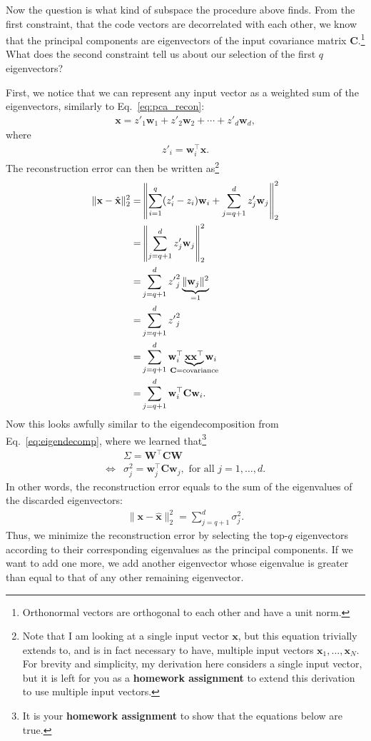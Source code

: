 \documentclass{report}
\newcommand{\vect}[1]{\mathbf{#1}}
\newcommand{\matr}[1]{\mathbf{#1}}
\newcommand{\vx}[0]{\vect{x}}
\newcommand{\vw}[0]{\vect{w}}
\newcommand{\mW}[0]{\matr{W}}
\newcommand{\mC}{\matr{C}}
\begin{document}
Now the question is what kind of subspace the procedure above finds. From the
first constraint, that the code vectors are decorrelated with each other, we
know that the principal components are eigenvectors of the input covariance
matrix $\mC$.\footnote{
    Orthonormal vectors are orthogonal to each other and have a unit norm.
} What does the second constraint tell us about our selection of the first $q$
eigenvectors?

First, we notice that we can represent any input vector as a weighted sum of the
eigenvectors, similarly to Eq.~\eqref{eq:pca_recon}:
\begin{align*}
    \vx = z'_1 \vw_1 + z'_2 \vw_2 + \cdots + z'_d \vw_d,
\end{align*}
where 
\begin{align*}
    z'_i = \vw_i^\top \vx.
\end{align*}
The reconstruction error can then be written as\footnote{
    Note that I am looking at a single input vector $\vx$, but this equation
    trivially extends to, and is in fact necessary to have, multiple input
    vectors $\vx_1, \ldots, \vx_N$. For brevity and simplicity, my derivation
    here considers a single input vector, but it is left for you as a {\bf
    homework assignment} to extend this derivation to use multiple input
    vectors.
}
\begin{align*}
    \| \vx - \hat{\vx} \|^2_2 =&
    \left\| \sum_{i=1}^q (z'_i - z_i) \vw_i + \sum_{j=q+1}^d z'_j \vw_j \right\|^2_2 \\
    =& 
    \left\| \sum_{j=q+1}^d z'_j \vw_j \right\|^2_2 \\
    =& 
    \sum_{j=q+1}^d {z'}_j^2 \underbrace{\| \vw_j \|^2}_{=1} \\
    =& 
    \sum_{j=q+1}^d {z'}_j^2 \\
    =&
    \sum_{j=q+1}^d \vw_i^\top \underbrace{\vx \vx^\top}_{
    \mathclap{\mC=\text{covariance}}} \vw_i \\
    =&
    \sum_{j=q+1}^d \vw_i^\top \mC \vw_i.
\end{align*}
Now this looks awfully similar to the eigendecomposition from
Eq.~\eqref{eq:eigendecomp}, where we learned that\footnote{
    It is your {\bf homework assignment} to show that the equations below are
    true.
}
\begin{align*}
    &\Sigma = \mW^\top \mC \mW \\
    \iff&
    \sigma_j^2 = \vw_j^\top \mC \vw_j,\text{ for all }j=1,\ldots,d.
\end{align*}
In other words, the reconstruction error equals to the sum of the eigenvalues of
the discarded eigenvectors:
\begin{align*}
    \| \vx - \hat{\vx} \|^2_2 =
    \sum_{j=q+1}^d \sigma_j^2.
\end{align*}
Thus, we minimize the reconstruction error by selecting the top-$q$ eigenvectors
according to their corresponding eigenvalues as the principal components. If we
want to add one more, we add another eigenvector whose eigenvalue is greater
than equal to that of any other remaining eigenvector.
\end{document}
